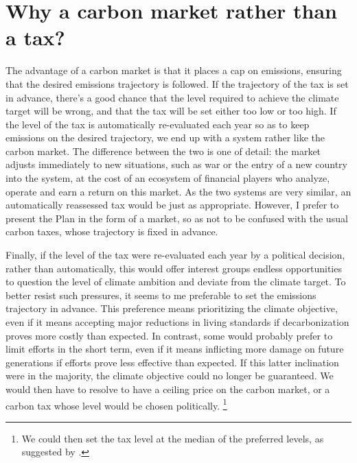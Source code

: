 \documentclass[a5paper,english,openany]{memoir}
\begin{document}
\section*{\normalsize Why a carbon market rather than a tax?}\label{q:taxe}

The advantage of a carbon market is that it places a cap on emissions, ensuring that the desired emissions trajectory is followed. If the trajectory of the tax is set in advance, there's %
a good chance that the level required to achieve the climate target will be wrong, and that the tax will be set either too low or too high. If the level of the tax is automatically re-evaluated
each year so as to keep emissions on the desired trajectory, we end up with a system rather like the carbon market. The difference between the two is one of detail: the market adjusts immediately to new situations, such as war or the entry of a new country into the system, %
at the cost of an ecosystem of financial players who analyze, %
operate and earn a return on this market. As the two systems are very similar, an automatically reassessed tax would be just as appropriate. However, I prefer to present the Plan in the form of a market, so as not to be confused with the usual carbon taxes, whose trajectory is fixed in advance. 

Finally, if the level of the tax were re-evaluated each year by a political decision, rather than automatically, %
this would offer interest groups endless opportunities to question the level of climate ambition and deviate from the climate target. To better resist such pressures, it seems to me preferable to set the emissions trajectory in advance. This preference means prioritizing %
the climate objective, even if it means accepting major reductions in living standards if decarbonization %
proves more costly than expected. 
In contrast, %
some would probably prefer to limit efforts in the short term, even if it means inflicting more damage on future generations if efforts prove less effective than expected. If this latter inclination were in the majority, the climate objective could no longer be guaranteed. We would then have to resolve to have a ceiling price on the carbon market, or a carbon tax whose level would be chosen politically. \footnote{We could then set the tax level at the median of the preferred levels, as suggested by \cite{weitzman_world_2017}.}
\end{document}
